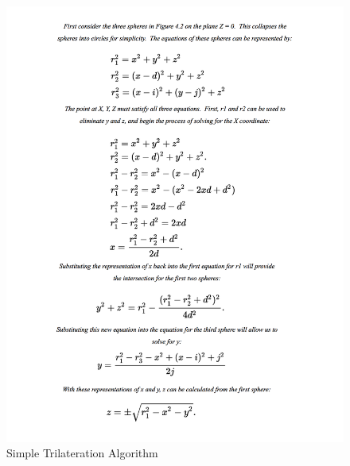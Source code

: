 \begin{figure}[h]
\centering
\includegraphics[width=.85\textwidth]{images/algo.jpg}
\caption{Simple Trilateration Algorithm}
\end{figure}

